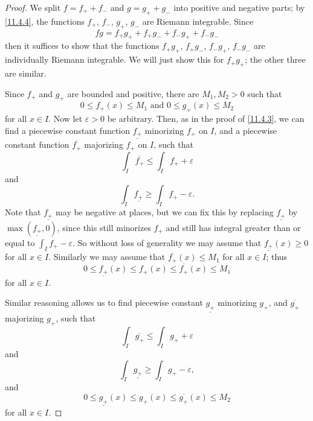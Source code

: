 \begin{proof}
  We split \(f = f_+ + f_-\) and \(g = g_+ + g_-\) into positive and negative parts;
  by \cref{11.4.4}, the functions \(f_+\), \(f_-\), \(g_+\), \(g_-\) are Riemann integrable.
  Since
  \[
    fg = f_+ g_+ + f_+ g_- + f_- g_+ + f_- g_-
  \]
  then it suffices to show that the functions \(f_+ g_+\), \(f_+ g_-\), \(f_- g_+\), \(f_- g_-\) are individually Riemann integrable.
  We will just show this for \(f_+ g_+\);
  the other three are similar.

  Since \(f_+\) and \(g_+\) are bounded and positive, there are \(M_1, M_2 > 0\) such that
  \[
    0 \leq f_+(x) \leq M_1 \text{ and } 0 \leq g_+(x) \leq M_2
  \]
  for all \(x \in I\).
  Now let \(\varepsilon > 0\) be arbitrary.
  Then, as in the proof of \cref{11.4.3}, we can find a piecewise constant function \(\underline{f_+}\) minorizing \(f_+\) on \(I\), and a piecewise constant function \(\overline{f_+}\) majorizing \(f_+\) on \(I\), such that
  \[
    \int_I \overline{f_+} \leq \int_I f_+ + \varepsilon
  \]
  and
  \[
    \int_I \underline{f_+} \geq \int_I f_+ - \varepsilon.
  \]
  Note that \(\underline{f_+}\) may be negative at places, but we can fix this by replacing \(\underline{f_+}\) by \(\max(\underline{f_+}, 0)\), since this still minorizes \(f_+\) and still has integral greater than or equal to \(\int_I f_+ - \varepsilon\).
  So without loss of generality we may assume that \(\underline{f_+}(x) \geq 0\) for all \(x \in I\).
  Similarly we may assume that \(\overline{f_+}(x) \leq M_1\) for all \(x \in I\);
  thus
  \[
    0 \leq \underline{f_+}(x) \leq f_+(x) \leq \overline{f_+}(x) \leq M_1
  \]
  for all \(x \in I\).

  Similar reasoning allows us to find piecewise constant \(\underline{g_+}\) minorizing \(g_+\), and \(\overline{g_+}\) majorizing \(g_+\), such that
  \[
    \int_I \overline{g_+} \leq \int_I g_+ + \varepsilon
  \]
  and
  \[
    \int_I \underline{g_+} \geq \int_I g_+ - \varepsilon,
  \]
  and
  \[
    0 \leq \underline{g_+}(x) \leq g_+(x) \leq \overline{g_+}(x) \leq M_2
  \]
  for all \(x \in I\).


\end{proof}
